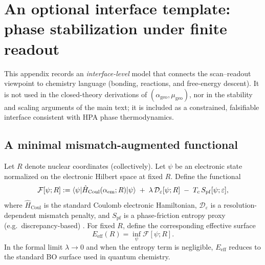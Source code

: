 \section{An optional interface template: phase stabilization under finite readout}
\label{app:interface_phase_friction}

This appendix records an \emph{interface-level} model that connects the scan--readout viewpoint to chemistry language (bonding, reactions, and free-energy descent). It is not used in the closed-theory derivations of $(\alpha_{\mathrm{geo}},\mu_{\mathrm{geo}})$, nor in the stability and scaling arguments of the main text; it is included as a constrained, falsifiable interface consistent with HPA phase thermodynamics.

\subsection{A minimal mismatch-augmented functional}
Let $R$ denote nuclear coordinates (collectively). Let $\psi$ be an electronic state normalized on the electronic Hilbert space at fixed $R$. Define the functional
\begin{equation}\label{eq:chem_free_energy_template}
\mathcal{F}[\psi;R]
:=
\braket{\psi|\hat H_{\mathrm{Coul}}(\alpha_{\mathrm{em}};R)|\psi}
\;+\;\lambda\,\mathcal{D}_\varepsilon[\psi;R]
\;-\;T_c\, S_{\mathrm{pf}}[\psi;\varepsilon],
\end{equation}
where $\hat H_{\mathrm{Coul}}$ is the standard Coulomb electronic Hamiltonian, $\mathcal{D}_\varepsilon$ is a resolution-dependent mismatch penalty, and $S_{\mathrm{pf}}$ is a phase-friction entropy proxy (e.g.\ discrepancy-based) \cite{Ma2025HPT}.
For fixed $R$, define the corresponding effective surface
\begin{equation}
E_{\mathrm{eff}}(R)=\inf_{\psi}\mathcal{F}[\psi;R].
\end{equation}
In the formal limit $\lambda\to 0$ and when the entropy term is negligible, $E_{\mathrm{eff}}$ reduces to the standard BO surface used in quantum chemistry.

